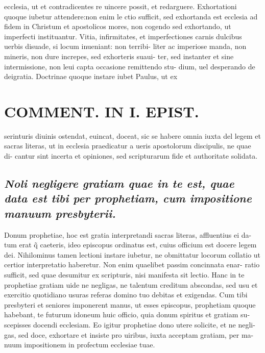 \documentclass{article}
\begin{document}
\begin{pages}
ecclesia, ut et contradicentes re uincere possit, et redarguere. Exhortationi quoque iubetur attendere:non enim le ctio sufficit, sed exhortanda est ecclesia ad fidem in Christum et apostolicos mores, non cogendo sed exhortando, ut imperfecti instituantur. Vitia, infirmitates, et imperfectiones carnis dulcibus uerbis disuade, si locum inueniant: non terribi- liter ac imperiose manda, non mineris, non dure increpes, sed exhorteris suaui- ter, sed instanter et sine intermissione, non leui capta occasione remittendo stu- dium, uel desperando de deigratia. Doctrinae quoque instare iubet Paulus, ut ex  \pend
\section*{COMMENT. IN I. EPIST. }
\marginpar{[ p.512 ]}\pstart serinturis diuinis ostendat, euincat, doceat, sic se habere omnia iuxta del legem et sacras literas, ut in ecclesia praedicatur a ueris apostolorum discipulis, ne quae di- cantur sint incerta et opiniones, sed scripturarum fide et authoritate solidata.  \pend
{}
{}
\subsection*{\textit{Noli negligere gratiam quae in te est, quae data est tibi per prophetiam, cum impositione manuum presbyterii. }}\pstart Donum prophetiae, hoc est gratia interpretandi sacras literas, affluentius ei da- tum erat q̃ caeteris, ideo episcopus ordinatus est, cuius officium est docere legem dei. Nihilominus tamen lectioni instare iubetur, ne obmittatur locorum collatio ut certior interpretatio haberetur. Non enim quaelibet passim concinnata enar- ratio sufficit, sed quae desumitur ex scripturis, nisi manifesta sit lectio. Hanc in te prophetiae gratiam uide ne negligas, ne talentum creditum abscondas, sed usu et exercitio quotidiano usuras referas domino tuo debitas et exigendas. Cum tibi presbyteri et seniores imponerent manus, ut esses episcopus, prophetiam quoque  habebant, te futurum idoneum huic officio, quia donum spiritus et gratiam su- scepisses docendi ecclesiam. Eo igitur prophetiae dono utere solicite, et ne negli- gas, sed doce, exhortare et insiste pro uiribus, iuxta acceptam gratiam, per ma- nuum impositionem in profectum ecclesiae tuae.  \pend
{}
{}

\end{pages}
\end{document}
